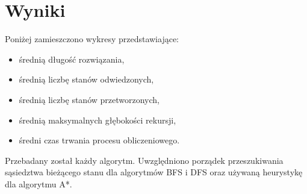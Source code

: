 \documentclass{classrep}
\begin{document}
\section{Wyniki}
{\color{black}
Poniżej zamieszczono wykresy przedstawiające: 
\begin{itemize}
  \item średnią długość rozwiązania,
  \item średnią liczbę stanów odwiedzonych,
  \item średnią liczbę stanów przetworzonych,
  \item średnią maksymalnych głębokości rekursji,
  \item średni czas trwania procesu obliczeniowego.\\
\end{itemize}
Przebadany został każdy algorytm. Uwzględniono porządek przeszukiwania sąsiedztwa bieżącego stanu dla algorytmów BFS i DFS oraz używaną heurystykę dla algorytmu A*.
\newpage

}
\end{document}
